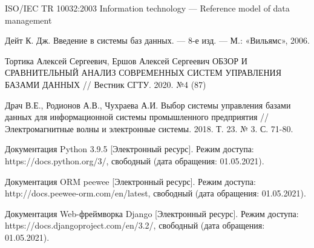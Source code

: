 \documentclass[10pt,a4paper]{report}
\begin{document}
	\makeatletter %
	\def\@biblabel#1{#1. }
	\makeatother
	\begin{thebibliography}{4}
		 ISO/IEC TR 10032:2003 Information technology — Reference model of data management
		
		 Дейт К. Дж. Введение в системы баз данных. — 8-е изд. — М.:
		«Вильямс», 2006.
				
		 Тортика Алексей Сергеевич, Ершов Алексей Сергеевич ОБЗОР И СРАВНИТЕЛЬНЫЙ АНАЛИЗ СОВРЕМЕННЫХ СИСТЕМ УПРАВЛЕНИЯ БАЗАМИ ДАННЫХ // Вестник СГТУ. 2020. №4 (87)
		
		 Драч В.Е., Родионов А.В., Чухраева А.И. Выбор системы управления базами данных для информационной системы промышленного предприятия // Электромагнитные волны и электронные системы. 2018. Т. 23. № 3. С. 71-80.
		
		 Документация Python 3.9.5 [Электронный ресурс]. Режим доступа: https://docs.python.org/3/, свободный (дата обращения: 01.05.2021).
		
		 Документация ORM peewee [Электронный ресурс]. Режим доступа:
		 http://docs.peewee-orm.com/en/latest, свободный (дата обращения: 01.05.2021).
		 
 		 Документация Web-фреймворка Django [Электронный ресурс]. Режим доступа: https://docs.djangoproject.com/en/3.2/, свободный (дата обращения: 01.05.2021).
	\end{thebibliography}
\end{document}
